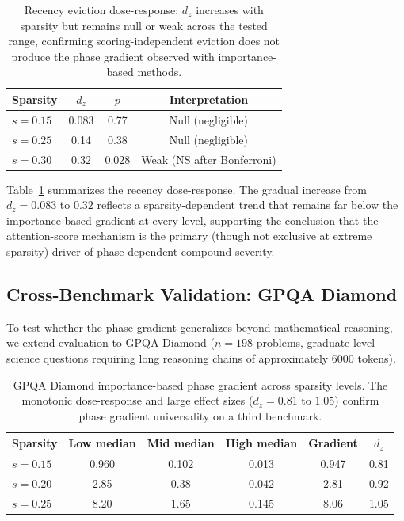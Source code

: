 \documentclass[11pt,a4paper]{article}
\begin{document}
\begin{table}[t]
\centering
\caption{Recency eviction dose-response: $d_z$ increases with sparsity but remains null or weak across the tested range, confirming scoring-independent eviction does not produce the phase gradient observed with importance-based methods.}
\label{tab:recency_dose}
\begin{tabular}{lccc}
\toprule
Sparsity & $d_z$ & $p$ & Interpretation \\
\midrule
$s=0.15$ & 0.083 & 0.77 & Null (negligible) \\
$s=0.25$ & 0.14 & 0.38 & Null (negligible) \\
$s=0.30$ & 0.32 & 0.028 & Weak (NS after Bonferroni) \\
\bottomrule
\end{tabular}
\end{table}

Table~\ref{tab:recency_dose} summarizes the recency dose-response. The gradual increase from $d_z=0.083$ to $0.32$ reflects a sparsity-dependent trend that remains far below the importance-based gradient at every level, supporting the conclusion that the attention-score mechanism is the primary (though not exclusive at extreme sparsity) driver of phase-dependent compound severity.

\subsection{Cross-Benchmark Validation: GPQA Diamond}

To test whether the phase gradient generalizes beyond mathematical reasoning, we extend evaluation to GPQA Diamond ($n=198$ problems, graduate-level science questions requiring long reasoning chains of approximately 6000 tokens).

\begin{table}[t]
\centering
\caption{GPQA Diamond importance-based phase gradient across sparsity levels. The monotonic dose-response and large effect sizes ($d_z=0.81$ to $1.05$) confirm phase gradient universality on a third benchmark.}
\label{tab:gpqa_dose}
\begin{tabular}{lccccc}
\toprule
Sparsity & Low median & Mid median & High median & Gradient & $d_z$ \\
\midrule
$s=0.15$ & 0.960 & 0.102 & 0.013 & 0.947 & 0.81 \\
$s=0.20$ & 2.85 & 0.38 & 0.042 & 2.81 & 0.92 \\
$s=0.25$ & 8.20 & 1.65 & 0.145 & 8.06 & 1.05 \\
\bottomrule
\end{tabular}
\end{table}
\end{document}
